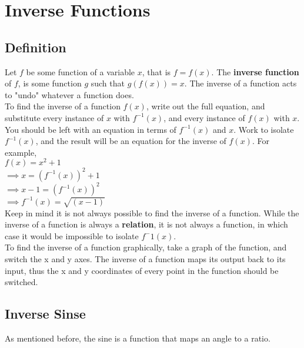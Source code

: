 \section{Inverse Functions}

\subsection{Definition}

Let $f$ be some function of a variable $x$, that is $f=f(x)$.  The {\bf inverse function} of $f$, is some function $g$ such that $g(f(x))=x$.  The inverse of a function acts to "undo" whatever a function does.\\

To find the inverse of a function $f(x)$, write out the full equation, and substitute every instance of $x$ with $f^{-1}(x)$, and every instance of $f(x)$ with $x$.  You should be left with an equation in terms of $f^{-1}(x)$ and $x$.  Work to isolate $f^{-1}(x)$, and the result will be an equation for the inverse of $f(x)$.  For example,\\

\tab$f(x) = x^2 + 1$\\

\tab$\implies x = (f^{-1}(x))^2 + 1$\\

\tab$\implies x - 1 = (f^{-1}(x))^2$\\

\tab$\implies f^{-1}(x) = \sqrt{(x - 1)}$\\

Keep in mind it is not always possible to find the inverse of a function.  While the inverse of a function is always a {\bf relation}, it is not always a function, in which case it would be impossible to isolate $f^-1(x)$.\\

To find the inverse of a function graphically, take a graph of the function, and switch the x and y axes.  The inverse of a function maps its output back to its input, thus the x and y coordinates of every point in the function should be switched.\\

\subsection{Inverse Sinse}

As mentioned before, the sine is a function that maps an angle to a ratio.\\

